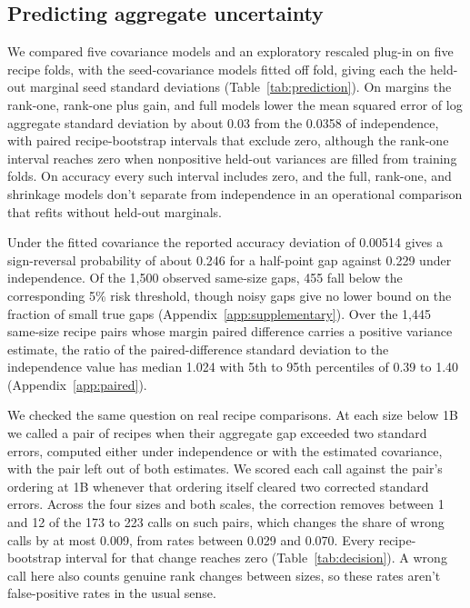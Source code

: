 \documentclass{article}
\begin{document}
\subsection{Predicting aggregate uncertainty}
\label{sec:prediction}
We compared five covariance models and an exploratory rescaled plug-in on five recipe folds, with the seed-covariance models fitted off fold, giving each the held-out marginal seed standard deviations (Table~\ref{tab:prediction}). On margins the rank-one, rank-one plus gain, and full models lower the mean squared error of log aggregate standard deviation by about 0.03 from the 0.0358 of independence, with paired recipe-bootstrap intervals that exclude zero, although the rank-one interval reaches zero when nonpositive held-out variances are filled from training folds. On accuracy every such interval includes zero, and the full, rank-one, and shrinkage models don't separate from independence in an operational comparison that refits without held-out marginals.

Under the fitted covariance the reported accuracy deviation of 0.00514 gives a sign-reversal probability of about 0.246 for a half-point gap against 0.229 under independence. Of the 1,500 observed same-size gaps, 455 fall below the corresponding 5\% risk threshold, though noisy gaps give no lower bound on the fraction of small true gaps (Appendix~\ref{app:supplementary}). Over the 1,445 same-size recipe pairs whose margin paired difference carries a positive variance estimate, the ratio of the paired-difference standard deviation to the independence value has median 1.024 with 5th to 95th percentiles of 0.39 to 1.40 (Appendix~\ref{app:paired}).

We checked the same question on real recipe comparisons. At each size below 1B we called a pair of recipes when their aggregate gap exceeded two standard errors, computed either under independence or with the estimated covariance, with the pair left out of both estimates. We scored each call against the pair's ordering at 1B whenever that ordering itself cleared two corrected standard errors. Across the four sizes and both scales, the correction removes between 1 and 12 of the 173 to 223 calls on such pairs, which changes the share of wrong calls by at most 0.009, from rates between 0.029 and 0.070. Every recipe-bootstrap interval for that change reaches zero (Table~\ref{tab:decision}). A wrong call here also counts genuine rank changes between sizes, so these rates aren't false-positive rates in the usual sense.
\end{document}
